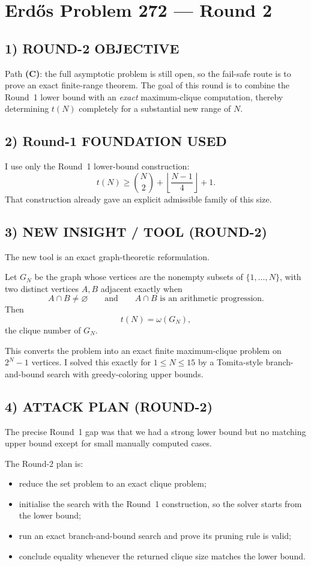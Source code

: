 \section{Erd\H{o}s Problem 272 --- Round 2}

\subsection*{1) ROUND-2 OBJECTIVE}
Path \textbf{(C)}: the full asymptotic problem is still open, so the fail-safe route is to prove an exact finite-range theorem. The goal of this round is to combine the Round~1 lower bound with an \emph{exact} maximum-clique computation, thereby determining $t(N)$ completely for a substantial new range of $N$.

\subsection*{2) Round-1 FOUNDATION USED}
I use only the Round~1 lower-bound construction:
\[
t(N)\ge \binom{N}{2}+\left\lfloor\frac{N-1}{4}\right\rfloor+1.
\]
That construction already gave an explicit admissible family of this size.

\subsection*{3) NEW INSIGHT / TOOL (ROUND-2)}
The new tool is an exact graph-theoretic reformulation.

Let $G_N$ be the graph whose vertices are the nonempty subsets of $\{1,\dots,N\}$, with two distinct vertices $A,B$ adjacent exactly when
\[
A\cap B\neq \varnothing
\qquad\text{and}\qquad
A\cap B\text{ is an arithmetic progression.}
\]
Then
\[
t(N)=\omega(G_N),
\]
the clique number of $G_N$.

This converts the problem into an exact finite maximum-clique problem on $2^N-1$ vertices. I solved this exactly for $1\le N\le 15$ by a Tomita-style branch-and-bound search with greedy-coloring upper bounds.

\subsection*{4) ATTACK PLAN (ROUND-2)}
The precise Round~1 gap was that we had a strong lower bound but no matching upper bound except for small manually computed cases.

The Round-2 plan is:
\begin{itemize}
\item reduce the set problem to an exact clique problem;
\item initialise the search with the Round~1 construction, so the solver starts from the lower bound;
\item run an exact branch-and-bound search and prove its pruning rule is valid;
\item conclude equality whenever the returned clique size matches the lower bound.
\end{itemize}

